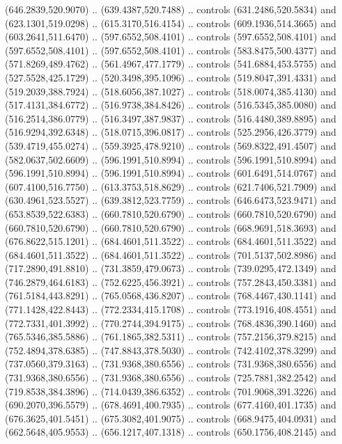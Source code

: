 \begin{scope}[shift={(407.03862,-246.29561)}]
    (646.2839,520.9070) .. (639.4387,520.7488) .. controls (631.2486,520.5834) and
    (623.1301,519.0298) .. (615.3170,516.4154) .. controls (609.1936,514.3665) and
    (603.2641,511.6470) .. (597.6552,508.4101) .. controls (597.6552,508.4101) and
    (597.6552,508.4101) .. (597.6552,508.4101) .. controls (583.8475,500.4377) and
    (571.8269,489.4762) .. (561.4967,477.1779) .. controls (541.6884,453.5755) and
    (527.5528,425.1729) .. (520.3498,395.1096) .. controls (519.8047,391.4331) and
    (519.2039,388.7924) .. (518.6056,387.1027) .. controls (518.0074,385.4130) and
    (517.4131,384.6772) .. (516.9738,384.8426) .. controls (516.5345,385.0080) and
    (516.2514,386.0779) .. (516.3497,387.9837) .. controls (516.4480,389.8895) and
    (516.9294,392.6348) .. (518.0715,396.0817) .. controls (525.2956,426.3779) and
    (539.4719,455.0274) .. (559.3925,478.9210) .. controls (569.8322,491.4507) and
    (582.0637,502.6609) .. (596.1991,510.8994) .. controls (596.1991,510.8994) and
    (596.1991,510.8994) .. (596.1991,510.8994) .. controls (601.6491,514.0767) and
    (607.4100,516.7750) .. (613.3753,518.8629) .. controls (621.7406,521.7909) and
    (630.4961,523.5527) .. (639.3812,523.7759) .. controls (646.6473,523.9471) and
    (653.8539,522.6383) .. (660.7810,520.6790) .. controls (660.7810,520.6790) and
    (660.7810,520.6790) .. (660.7810,520.6790) .. controls (668.9691,518.3693) and
    (676.8622,515.1201) .. (684.4601,511.3522) .. controls (684.4601,511.3522) and
    (684.4601,511.3522) .. (684.4601,511.3522) .. controls (701.5137,502.8986) and
    (717.2890,491.8810) .. (731.3859,479.0673) .. controls (739.0295,472.1349) and
    (746.2879,464.6183) .. (752.6225,456.3921) .. controls (757.2843,450.3381) and
    (761.5184,443.8291) .. (765.0568,436.8207) .. controls (768.4467,430.1141) and
    (771.1428,422.8443) .. (772.2334,415.1708) .. controls (773.1916,408.4551) and
    (772.7331,401.3992) .. (770.2744,394.9175) .. controls (768.4836,390.1460) and
    (765.5346,385.5886) .. (761.1865,382.5311) .. controls (757.2156,379.8215) and
    (752.4894,378.6385) .. (747.8843,378.5030) .. controls (742.4102,378.3299) and
    (737.0560,379.3163) .. (731.9368,380.6556) .. controls (731.9368,380.6556) and
    (731.9368,380.6556) .. (731.9368,380.6556) .. controls (725.7881,382.2542) and
    (719.8538,384.3896) .. (714.0439,386.6352) .. controls (701.9068,391.3226) and
    (690.2070,396.5579) .. (678.4691,400.7935) .. controls (677.4160,401.1735) and
    (676.3625,401.5451) .. (675.3082,401.9075) .. controls (668.9475,404.0931) and
    (662.5648,405.9553) .. (656.1217,407.1318) .. controls (650.1756,408.2145) and

\end{scope}
